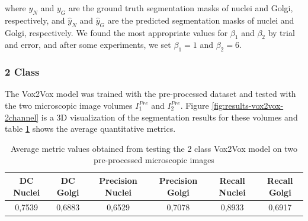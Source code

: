\noindent where $y_N$ and $y_G$ are the ground truth segmentation masks of nuclei and Golgi, respectively, and $\hat{y}_N$ and $\hat{y}_G$ are the predicted segmentation masks of nuclei and Golgi, respectively. We found the most appropriate values for $\beta_1$ and $\beta_2$ by trial and error, and after some experiments, we set $\beta_1 = 1$ and $\beta_2 = 6$.


\subsubsection*{2 Class}

The Vox2Vox model was trained with the pre-processed dataset and tested with the two microscopic image volumes $I^{Pre}_1$ and $I^{Pre}_2$. Figure \ref{fig:results-vox2vox-2channel} is a 3D visualization of the segmentation results for these volumes and table \ref{tab:results-2class-vox2vox} shows the average quantitative metrics. 

\begin{table}[!htb]
\centering
\caption{Average metric values obtained from testing the 2 class Vox2Vox model on two pre-processed microscopic images}
\label{tab:results-2class-vox2vox}
\renewcommand\arraystretch{1.4}
\begin{tabular}{|c|c|c|c|c|c|}
\hline
DC  Nuclei & DC Golgi & Precision Nuclei & Precision Golgi & Recall Nuclei & Recall Golgi \\ \hline
0,7539     & 0,6883   & 0,6529           & 0,7078          & 0,8933        & 0,6917       \\ \hline
\end{tabular}%

\end{table}

